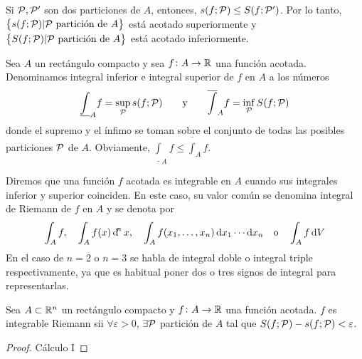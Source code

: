 \begin{col}
    Si $\mathcal{P}, \mathcal{P}^\prime$ son dos particiones de $A$, entonces,
    $s(f;\mathcal{P}) \leq S(f;\mathcal{P}^\prime)$. Por lo tanto,
    $\left\{s(f;\mathcal{P}) \vert \mathcal{P} \text{ partición de } A\right\}$ está acotado superiormente
    y $\left\{S(f;\mathcal{P}) \vert\mathcal{P}\text{ partición de } A\right\}$ está acotado inferiormente.
\end{col}

\begin{defi}
    Sea $A$ un rectángulo compacto y sea $f \colon A \to \mathbb{R}$ una función
    acotada. Denominamos integral inferior e integral superior de $f$ en $A$ a los
    números
    \[
        \underline{\int}_A f = \sup_{\mathcal{P}} s(f;\mathcal{P}) \qquad \text{y} \qquad
        \overline{\int}_A f = \inf_{\mathcal{P}} S(f;\mathcal{P})
    \]
    donde el supremo y el ínfimo se toman sobre el conjunto de todas las posibles
    particiones $\mathcal{P}$ de $A$. Obviamente, $\underline{\int}_A f \leq
    \overline{\int}_A f$.
\end{defi}

\begin{defi}
    Diremos que una función $f$ acotada es integrable en $A$ cuando sus integrales
    inferior y superior coinciden. En este caso, su valor común se denomina
    integral de Riemann de $f$ en $A$ y se denota por
    \[
        \int_A f, \quad \int_A f(x) \dif^nx, \quad \int_A f(x_1,\dots,x_n)
        \dif x_1 \cdots \dif x_n \quad \text{o} \quad \int_A f \dif V
    \]
    En el caso de $n=2$ o $n=3$ se habla de integral doble o integral triple
    respectivamente, ya que es habitual poner dos o tres signos de integral para
    representarlas.
\end{defi}

\begin{prop}
    Sea $A \subset \mathbb{R}^n$ un rectángulo compacto y $f \colon A \to \mathbb{R}$ una
    función acotada. $f$ es integrable Riemann sii $\forall \varepsilon > 0$,
    $\exists \mathcal{P}$ partición de $A$ tal que $S(f;\mathcal{P})-s(f;\mathcal{P}) < \varepsilon$.
\end{prop}
\begin{proof}
    Cálculo I
\end{proof}

